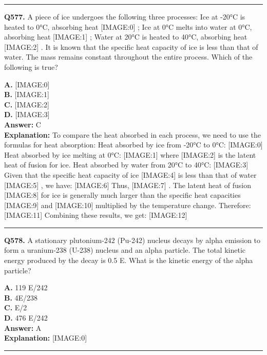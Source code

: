 \documentclass[12pt]{article}
\begin{document}
\hrule
\vspace{1em}


\noindent
\textbf{Q577.} A piece of ice undergoes the following three processes:
Ice at -20°C is heated to 0°C, absorbing heat
[IMAGE:0]
;
Ice at 0°C melts into water at 0°C, absorbing heat
[IMAGE:1]
;
Water at 20°C is heated to 40°C, absorbing heat
[IMAGE:2]
.
It is known that the specific heat capacity of ice is less than that of water. The mass remains constant throughout the entire process. Which of the following is true?



\textbf{A.} [IMAGE:0] \\
\textbf{B.} [IMAGE:1] \\
\textbf{C.} [IMAGE:2] \\
\textbf{D.} [IMAGE:3] \\

\textbf{Answer:} C \\
\textbf{Explanation:} To compare the heat absorbed in each process, we need to use the formulas for heat absorption:
Heat absorbed by ice from -20°C to 0°C:
[IMAGE:0]
Heat absorbed by ice melting at 0°C:
[IMAGE:1]
where
[IMAGE:2]
is the latent heat of fusion for ice.
Heat absorbed by water from 20°C to 40°C:
[IMAGE:3]
Given that the specific heat capacity of ice
[IMAGE:4]
is less than that of water
[IMAGE:5]
, we have:
[IMAGE:6]
Thus,
[IMAGE:7]
.
The latent heat of fusion
[IMAGE:8]
for ice is generally much larger than the specific heat capacities
[IMAGE:9]
and
[IMAGE:10]
multiplied by the temperature change. Therefore:
[IMAGE:11]
Combining these results, we get:
[IMAGE:12]

\hrule
\vspace{1em}


\noindent
\textbf{Q578.} A stationary plutonium-242 (Pu-242) nucleus decays by alpha emission to form a uranium-238 (U-238) nucleus and an alpha particle. The total kinetic energy produced by the decay is
0.5
E.
What is the kinetic energy of the alpha particle?



\textbf{A.} 119
E/242 \\
\textbf{B.} 4E/238 \\
\textbf{C.} E/2 \\
\textbf{D.} 476
E/242 \\

\textbf{Answer:} A \\
\textbf{Explanation:} [IMAGE:0]

\hrule
\vspace{1em}
\end{document}
